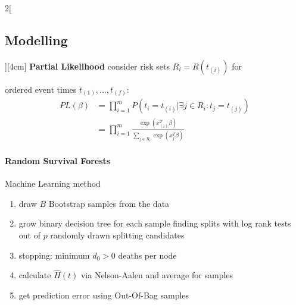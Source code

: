 \documentclass[8pt]{extarticle}
\begin{document}
\begin{multicols}{2}[\subsection{Modelling}][4cm]
\textbf{Partial Likelihood} consider risk sets $R_i = R(t_{(i)})$ for 

ordered event times $t_{(1)}, ..., t_{(f)}$:
\begin{align*}
PL(\beta) &= \prod_{i=1}^m P(t_i=t_{(i)}|\exists j\in R_i:t_j=t_{(j)})\\
&= \prod_{i=1}^m \frac{\exp\left(x^T_{(i)}\beta\right)}{\sum_{j\in R_i}\exp\left(x^T_{j}\beta\right)}
\end{align*}



\paragraph{Random Survival Forests} Machine Learning method
\begin{enumerate}[itemsep=-0.5em]
\item draw $B$ Bootstrap samples from the data
\item grow binary decision tree for each sample finding splits with log rank tests out of $p$ randomly drawn splitting candidates
\item stopping: minimum $d_0 > 0$ deaths per node
\item calculate $\hat{H}(t)$ via Nelson-Aalen and average for samples 
\item get prediction error using Out-Of-Bag samples
\end{enumerate}


\end{multicols}
\end{document}
